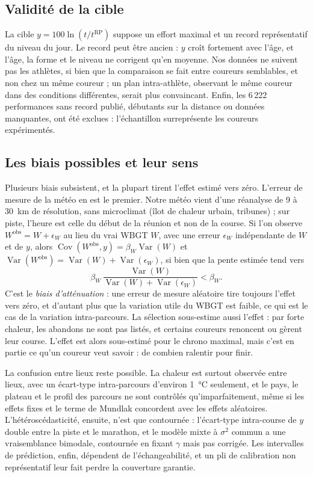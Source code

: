 \documentclass[11pt,a4paper]{article}
\DeclareMathOperator{\Var}{Var}
\DeclareMathOperator{\Cov}{Cov}
\newcommand{\RP}{\mathrm{RP}}
\begin{document}
\subsection{Validité de la cible}\label{sec:validite_cible}

La cible $y = 100\ln(t/t^{\RP})$ suppose un effort maximal et un record représentatif du niveau du jour. Le record
peut être ancien : $y$ croît fortement avec l'âge, et l'âge, la forme et le niveau ne corrigent qu'en moyenne. Nos
données ne suivent pas les athlètes, si bien que la comparaison se fait entre coureurs semblables, et non chez un même
coureur ; un plan intra-athlète, observant le même coureur dans des conditions différentes, serait plus convaincant.
Enfin, les 6\,222 performances sans record publié, débutants sur la distance ou données manquantes, ont été exclues :
l'échantillon surreprésente les coureurs expérimentés.

\subsection{Les biais possibles et leur sens}\label{sec:biais}

Plusieurs biais subsistent, et la plupart tirent l'effet estimé vers zéro. L'erreur de mesure de la météo en est le
premier. Notre météo vient d'une réanalyse de 9 à 30~km de résolution, sans microclimat (îlot de chaleur urbain,
tribunes) ; sur piste, l'heure est celle du début de la réunion et non de la course. Si l'on observe
$W^{\text{obs}} = W + \epsilon_W$ au lieu du vrai WBGT $W$, avec une erreur $\epsilon_W$ indépendante de $W$ et de
$y$, alors $\Cov(W^{\text{obs}}, y) = \beta_W \Var(W)$ et $\Var(W^{\text{obs}}) = \Var(W) + \Var(\epsilon_W)$, si
bien que la pente estimée tend vers
\[
\beta_W\,\frac{\Var(W)}{\Var(W) + \Var(\epsilon_W)} < \beta_W .
\]
C'est le \emph{biais d'atténuation} : une erreur de mesure aléatoire tire toujours l'effet vers zéro, et d'autant plus
que la variation utile du WBGT est faible, ce qui est le cas de la variation intra-parcours. La sélection
sous-estime aussi l'effet : par forte chaleur, les abandons ne sont pas listés, et certains coureurs renoncent ou
gèrent leur course. L'effet est alors sous-estimé pour le chrono maximal, mais c'est en partie ce qu'un coureur veut
savoir : de combien ralentir pour finir.

La confusion entre lieux reste possible. La chaleur est surtout observée entre lieux, avec un écart-type
intra-parcours d'environ 1~°C seulement, et le pays, le plateau et le profil des parcours ne sont contrôlés
qu'imparfaitement, même si les effets fixes et le terme de Mundlak concordent avec les effets aléatoires.
L'hétéroscédasticité, ensuite, n'est que contournée : l'écart-type intra-course de $y$ double entre la piste et le
marathon, et le modèle mixte à $\sigma^2$ commun a une vraisemblance bimodale, contournée en fixant $\gamma$ mais pas
corrigée. Les intervalles de prédiction, enfin, dépendent de l'échangeabilité, et un pli de calibration non
représentatif leur fait perdre la couverture garantie.
\end{document}
